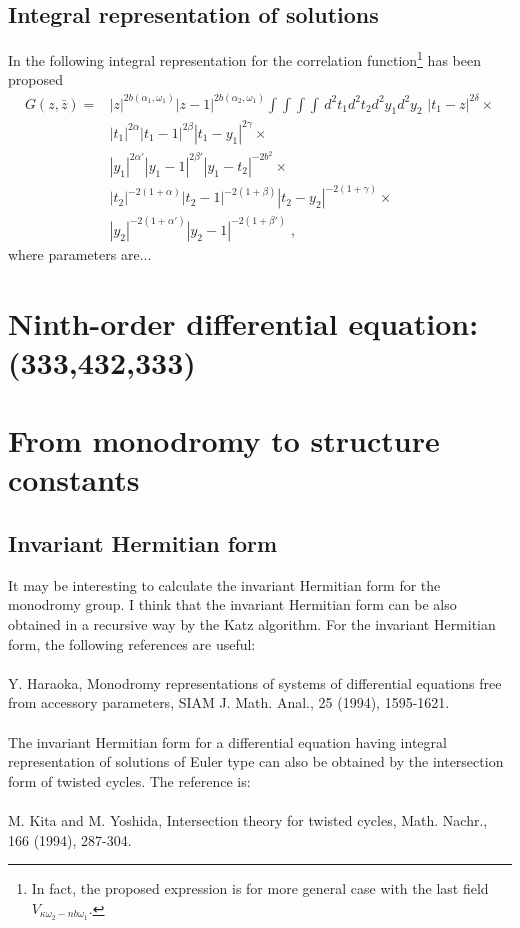 \documentclass[12pt,a4paper]{article}
\newcommand{\< }{{\langle}}
\renewcommand{\>}{{\rangle}}
\newcommand{\0}{\textbf{0.}}
\newcommand{\1}{\textbf{1.}}
\newcommand{\2}{\textbf{2.}}
\newcommand{\3}{\textbf{3.}}
\newcommand{\4}{\textbf{4.}}
\newcommand{\5}{\textbf{5.}}
\newcommand{\6}{\textbf{6.}}
\newcommand{\7}{\textbf{7.}}
\newcommand{\8}{\textbf{8.}}
\newcommand{\9}{\textbf{9.}}
\begin{document}
\subsection{Integral representation of solutions}
In \cite{fl08} the following integral representation for the correlation function\footnote{In fact,  the proposed expression is for more general case with the last field $V_{\kappa \omega_2-n b \omega_1}$.} has been proposed
\begin{align}
G(z,\bar{z})=&|z|^{2b (\alpha_1,\omega_1)}|z-1|^{2b (\alpha_2,\omega_1)}\int\int\int\int\, d^2 t_1d^2 t_2d^2 y_1d^2 y_2\,\,
|t_1-z|^{2\delta}\times\nonumber\\
& 
 |t_1|^{2\alpha}|t_1-1|^{2\beta} |t_1-y_1|^{2\gamma}\times\nonumber\\
&|y_1|^{2\alpha'}|y_1-1|^{2\beta'}|y_1-t_2|^{-2b^2}\times\nonumber\\
&|t_2|^{-2(1+\alpha)}|t_2-1|^{-2(1+\beta)}|t_2-y_2|^{-2(1+\gamma)}\times\nonumber\\
&|y_2|^{-2(1+\alpha')}|y_2-1|^{-2(1+\beta')}\;,
\end{align}
where parameters are... 


\section{Ninth-order differential equation: (333,432,333)}

\section{From monodromy to structure constants}

\subsection{Invariant Hermitian form}

It may be interesting to calculate the invariant Hermitian form for the monodromy group.
I think that the invariant Hermitian form can be also obtained in a recursive way by the Katz algorithm.
For the invariant Hermitian form, the following references are useful: \\\\
Y. Haraoka, Monodromy representations of systems of differential equations free from accessory parameters,
SIAM J. Math. Anal., 25 (1994), 1595-1621.\\\\
The invariant Hermitian form for a differential equation having integral representation of solutions of Euler type
can also be obtained by the intersection form of twisted cycles.
The reference is:\\\\
M. Kita and M. Yoshida, Intersection theory for twisted cycles,
Math. Nachr., 166 (1994), 287-304.
\end{document}
